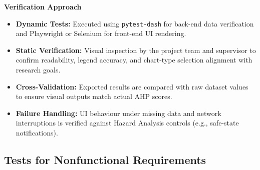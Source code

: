 \documentclass[12pt, titlepage]{article}
\begin{document}
\noindent\textbf{Verification Approach}

\begin{itemize}
  \item \textbf{Dynamic Tests:} Executed using \texttt{pytest-dash} for back-end data verification and Playwright or Selenium for front-end UI rendering.
  \item \textbf{Static Verification:} Visual inspection by the project team and supervisor to confirm readability, legend accuracy, and chart-type selection alignment with research goals.
  \item \textbf{Cross-Validation:} Exported results are compared with raw dataset values to ensure visual outputs match actual AHP scores.
  \item \textbf{Failure Handling:} UI behaviour under missing data and network interruptions is verified against Hazard Analysis controls (e.g., safe-state notifications).
\end{itemize}


\subsection{Tests for Nonfunctional Requirements}





\label{sec:nfr-tests}
\end{document}
